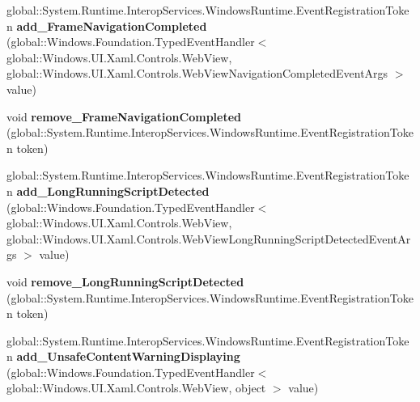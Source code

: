 \begin{DoxyCompactItemize}
\mbox{\label{interface_windows_1_1_u_i_1_1_xaml_1_1_controls_1_1_i_web_view2_a494bc914cf561ec9468446ccfa74f5e6}} 
global\+::\+System.\+Runtime.\+Interop\+Services.\+Windows\+Runtime.\+Event\+Registration\+Token {\bfseries add\+\_\+\+Frame\+Navigation\+Completed} (global\+::\+Windows.\+Foundation.\+Typed\+Event\+Handler$<$ global\+::\+Windows.\+U\+I.\+Xaml.\+Controls.\+Web\+View, global\+::\+Windows.\+U\+I.\+Xaml.\+Controls.\+Web\+View\+Navigation\+Completed\+Event\+Args $>$ value)
\item 
\mbox{\label{interface_windows_1_1_u_i_1_1_xaml_1_1_controls_1_1_i_web_view2_a63fd5a4351db39afa6abecf66d0cd735}} 
void {\bfseries remove\+\_\+\+Frame\+Navigation\+Completed} (global\+::\+System.\+Runtime.\+Interop\+Services.\+Windows\+Runtime.\+Event\+Registration\+Token token)
\item 
\mbox{\label{interface_windows_1_1_u_i_1_1_xaml_1_1_controls_1_1_i_web_view2_a2b49e3ea316c527b6e25017b9cf4bee5}} 
global\+::\+System.\+Runtime.\+Interop\+Services.\+Windows\+Runtime.\+Event\+Registration\+Token {\bfseries add\+\_\+\+Long\+Running\+Script\+Detected} (global\+::\+Windows.\+Foundation.\+Typed\+Event\+Handler$<$ global\+::\+Windows.\+U\+I.\+Xaml.\+Controls.\+Web\+View, global\+::\+Windows.\+U\+I.\+Xaml.\+Controls.\+Web\+View\+Long\+Running\+Script\+Detected\+Event\+Args $>$ value)
\item 
\mbox{\label{interface_windows_1_1_u_i_1_1_xaml_1_1_controls_1_1_i_web_view2_af037b1883abb030235ed2cf192337825}} 
void {\bfseries remove\+\_\+\+Long\+Running\+Script\+Detected} (global\+::\+System.\+Runtime.\+Interop\+Services.\+Windows\+Runtime.\+Event\+Registration\+Token token)
\item 
\mbox{\label{interface_windows_1_1_u_i_1_1_xaml_1_1_controls_1_1_i_web_view2_acdcabb7c71e53867b288d8758f233b6e}} 
global\+::\+System.\+Runtime.\+Interop\+Services.\+Windows\+Runtime.\+Event\+Registration\+Token {\bfseries add\+\_\+\+Unsafe\+Content\+Warning\+Displaying} (global\+::\+Windows.\+Foundation.\+Typed\+Event\+Handler$<$ global\+::\+Windows.\+U\+I.\+Xaml.\+Controls.\+Web\+View, object $>$ value)

\end{DoxyCompactItemize}
